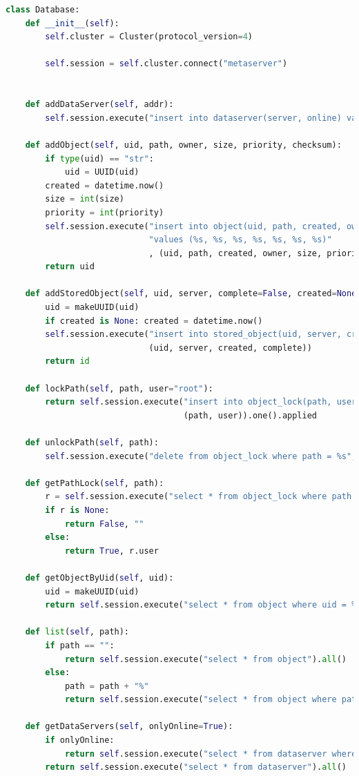 \documentclass{article}
\begin{document}
\begin{lstlisting}[language=Python, title=Codice]
class Database:
    def __init__(self):
        self.cluster = Cluster(protocol_version=4)

        self.session = self.cluster.connect("metaserver")


    def addDataServer(self, addr):
        self.session.execute("insert into dataserver(server, online) values (%s, false)", (addr, ))

    def addObject(self, uid, path, owner, size, priority, checksum):
        if type(uid) == "str":
            uid = UUID(uid)
        created = datetime.now()
        size = int(size)
        priority = int(priority)
        self.session.execute("insert into object(uid, path, created, owner, size, priority, checksum) "
                             "values (%s, %s, %s, %s, %s, %s, %s)"
                             , (uid, path, created, owner, size, priority, checksum))
        return uid

    def addStoredObject(self, uid, server, complete=False, created=None):
        uid = makeUUID(uid)
        if created is None: created = datetime.now()
        self.session.execute("insert into stored_object(uid, server, created, complete) values (%s, %s, %s, %s)",
                             (uid, server, created, complete))
        return id

    def lockPath(self, path, user="root"):
        return self.session.execute("insert into object_lock(path, user) values (%s, %s) if not exists",
                                    (path, user)).one().applied

    def unlockPath(self, path):
        self.session.execute("delete from object_lock where path = %s", (path, ))

    def getPathLock(self, path):
        r = self.session.execute("select * from object_lock where path = %s", (path, )).one()
        if r is None:
            return False, ""
        else:
            return True, r.user

    def getObjectByUid(self, uid):
        uid = makeUUID(uid)
        return self.session.execute("select * from object where uid = %s", (uid, )).one()

    def list(self, path):
        if path == "":
            return self.session.execute("select * from object").all()
        else:
            path = path + "%"
            return self.session.execute("select * from object where path like %s", (path, )).all()

    def getDataServers(self, onlyOnline=True):
        if onlyOnline:
            return self.session.execute("select * from dataserver where online=true allow filtering").all()
        return self.session.execute("select * from dataserver").all()


\end{lstlisting}
\end{document}
